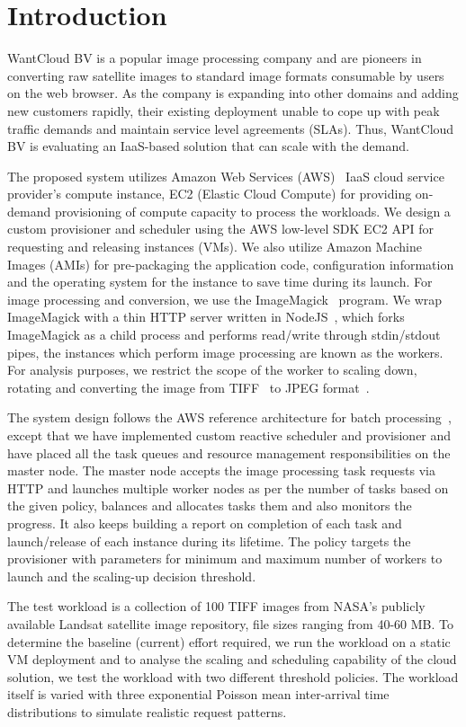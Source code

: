 \documentclass[a4paper]{IEEEtran}
\begin{document}
\section{Introduction}

WantCloud BV is a popular image processing company and are pioneers in converting raw satellite images to standard image formats consumable by users on the web browser. As the company is expanding into other domains and 
adding new customers rapidly, their existing deployment unable to cope up with peak traffic demands and
 maintain service level agreements (SLAs). Thus, WantCloud BV is evaluating an IaaS-based solution that
 can scale with the demand.

The proposed system utilizes Amazon Web Services (AWS)~\cite{aws} IaaS cloud service provider's compute instance, EC2 (Elastic Cloud Compute) for providing on-demand provisioning of compute capacity to process the workloads.
We design a custom provisioner and scheduler using the AWS low-level SDK EC2 API for requesting and releasing instances (VMs).
We also utilize Amazon Machine Images (AMIs) for pre-packaging the application code,
configuration information and the operating system for the instance to save time during its launch. For image processing and conversion, we use the ImageMagick~\cite{imagemagick} program. We wrap ImageMagick with a thin HTTP server written in NodeJS~\cite{nodejs}, which forks ImageMagick as a child process and performs read/write through stdin/stdout pipes, the instances which perform image processing are known as
the workers. For analysis purposes, we restrict the scope of the worker to scaling down, rotating and converting the
image from TIFF~\cite{rfc3302} to JPEG format~\cite{jpeg}.

The system design follows the AWS reference architecture for batch processing~\cite{aws_batch}, except that we have
implemented custom reactive scheduler and provisioner and have placed all the task queues and resource management responsibilities on the master node. The master node accepts the image processing task requests via HTTP and launches multiple worker nodes as per the number of tasks based on the given policy, balances and allocates tasks them and also monitors the progress. It also keeps building a report on completion of each task and launch/release of each instance during its lifetime. The policy targets the provisioner with parameters for minimum and maximum
number of workers to launch and the scaling-up decision threshold.

The test workload is a collection of 100 TIFF images from NASA's publicly available Landsat satellite image repository, file sizes ranging from 40-60 MB. To determine the baseline (current) effort required, we run the workload on a static VM deployment and to analyse the scaling and scheduling capability of the cloud solution, we test the workload with two different threshold policies. The workload itself is varied with three exponential Poisson mean inter-arrival time distributions to simulate realistic request patterns.
\end{document}
